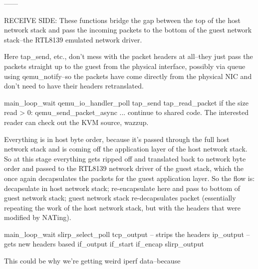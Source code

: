 \documentclass[11pt,pdftex,twocolumn]{article}
\begin{document}
------

RECEIVE SIDE:
These functions bridge the gap between the top of the host network stack and pass the incoming packets to the bottom of the guest network stack--the RTL8139 emulated network driver. 

Here tap_send, etc., don't mess with the packet headers at all--they just pass the packets straight up to the guest from the physical interface, possibly via queue using qemu_notify--so the packets have come directly from the physical NIC and don't need to have their headers retranslated.

main_loop_wait
qemu_io_handler_poll
tap_send
tap_read_packet
if the size read > 0:
	qemu_send_packet_async
... continue to shared code. The interested reader can check out the KVM source, wazzup.

Everything is in host byte order, because it's passed through the full host network stack and is coming off the application layer of the host network stack. So at this stage everything gets ripped off and translated back to network byte order and passed to the RTL8139 network driver of the guest stack, which the once again decapsulates the packets for the guest application layer. So the flow is: decapsulate in host network stack; re-encapsulate here and pass to bottom of guest network stack; guest network stack re-decapsulates packet (essentially repeating the work of the host network stack, but with the headers that were modified by NATing). 

main_loop_wait
slirp_select_poll
tcp_output -- strips the headers
ip_output -- gets new headers based 
if_output
if_start
if_encap
slirp_output

This could be why we're getting weird iperf data--because 








{\footnotesize 
}
\end{document}
